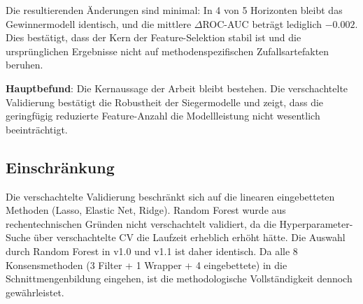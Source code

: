\documentclass[12pt,a4paper]{article}
\begin{document}
Die resultierenden Änderungen sind minimal: In 4 von 5 Horizonten bleibt das Gewinnermodell identisch, und die mittlere $\Delta$ROC-AUC beträgt lediglich $-0.002$. Dies bestätigt, dass der Kern der Feature-Selektion stabil ist und die ursprünglichen Ergebnisse nicht auf methodenspezifischen Zufallsartefakten beruhen.

\textbf{Hauptbefund}: Die Kernaussage der Arbeit bleibt bestehen. Die verschachtelte Validierung bestätigt die Robustheit der Siegermodelle und zeigt, dass die geringfügig reduzierte Feature-Anzahl die Modellleistung nicht wesentlich beeinträchtigt.

\subsection*{Einschränkung}
Die verschachtelte Validierung beschränkt sich auf die linearen eingebetteten Methoden (Lasso, Elastic Net, Ridge). Random Forest wurde aus rechentechnischen Gründen nicht verschachtelt validiert, da die Hyperparameter-Suche über verschachtelte CV die Laufzeit erheblich erhöht hätte. Die Auswahl durch Random Forest in v1.0 und v1.1 ist daher identisch. Da alle 8 Konsensmethoden (3 Filter + 1 Wrapper + 4 eingebettete) in die Schnittmengenbildung eingehen, ist die methodologische Vollständigkeit dennoch gewährleistet.
\end{document}
